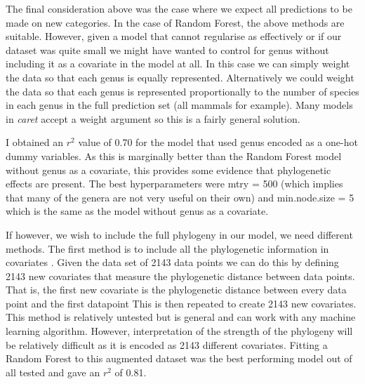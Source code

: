 \documentclass[10pt,]{article}
\begin{document}
The final consideration above was the case where we expect all predictions to be made on new categories.
In the case of Random Forest, the above methods are suitable.
However, given a model that cannot regularise as effectively or if our dataset was quite small we might have wanted to control for genus without including it as a covariate in the model at all.
In this case we can simply weight the data so that each genus is equally represented.
Alternatively we could weight the data so that each genus is represented proportionally to the number of species in each genus in the full prediction set (all mammals for example).
Many models in \emph{caret} accept a weight argument so this is a fairly general solution.

I obtained an \(r^2\) value of 0.70 for the model that used genus encoded as a one-hot dummy variables.
As this is marginally better than the Random Forest model without genus as a covariate, this provides some evidence that phylogenetic effects are present.
The best hyperparameters were mtry = 500 (which implies that many of the genera are not very useful on their own) and min.node.size = 5 which is the same as the model without genus as a covariate.

If however, we wish to include the full phylogeny in our model, we need different methods.
The first method is to include all the phylogenetic information in covariates \citep{hengl2018random}.
Given the data set of 2143 data points we can do this by defining 2143 new covariates that measure the phylogenetic distance between data points.
That is, the first new covariate is the phylogenetic distance between every data point and the first datapoint
This is then repeated to create 2143 new covariates.
This method is relatively untested but is general and can work with any machine learning algorithm.
However, interpretation of the strength of the phylogeny will be relatively difficult as it is encoded as 2143 different covariates.
Fitting a Random Forest to this augmented dataset was the best performing model out of all tested and gave an \(r^2\) of 0.81.
\end{document}
